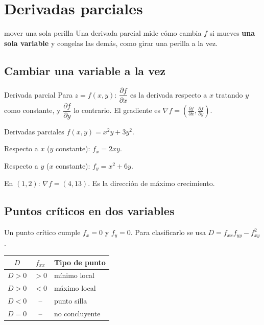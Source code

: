 \section{Derivadas parciales}
\label{sec:4-3}

\begin{tmconcepto}{mover una sola perilla}
Una derivada parcial mide c\'omo cambia $f$ si mueves \textbf{una sola variable} y congelas las dem\'as, como girar una perilla a la vez.
\end{tmconcepto}


\subsection{Cambiar una variable a la vez}
\begin{tmdef}{Derivada parcial}
Para $z=f(x, y)$: $\dfrac{\partial f}{\partial x}$ es la derivada respecto a $x$ tratando $y$ como constante, y $\dfrac{\partial f}{\partial y}$ lo contrario. El gradiente es $\nabla f=\left(\frac{\partial f}{\partial x},\frac{\partial f}{\partial y}\right)$.
\end{tmdef}

\begin{tmejemplo}{Derivadas parciales}
$f(x, y)=x^2y+3y^2$.
\begin{tmpasos}
\item Respecto a $x$ ($y$ constante): $f_x=2xy$.
\item Respecto a $y$ ($x$ constante): $f_y=x^2+6y$.
\item En $(1, 2)$: $\nabla f=(4, 13)$. Es la direcci\'on de m\'aximo crecimiento.
\end{tmpasos}
\end{tmejemplo}

\subsection{Puntos cr\'iticos en dos variables}
Un punto cr\'itico cumple $f_x=0$ y $f_y=0$. Para clasificarlo se usa $D=f_{xx}f_{yy}-f_{xy}^2$.

\begin{center}
\begin{tabular}{|c|c|l|}
\hline
\rowcolor{tmAzulClaro}\textbf{$D$} & \textbf{$f_{xx}$} & \textbf{Tipo de punto}\\ \hline
$D>0$ & $>0$ & m\'inimo local\\ \hline
$D>0$ & $<0$ & m\'aximo local\\ \hline
$D<0$ & -- & punto silla\\ \hline
$D=0$ & -- & no concluyente\\ \hline
\end{tabular}
\end{center}


